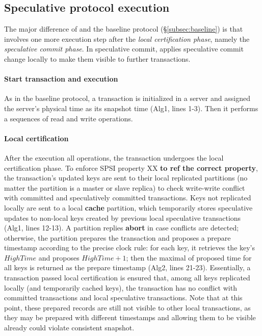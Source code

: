 \subsection{Speculative protocol execution}
\label{subsec:execution}
The major difference of \specula and the baseline protocol (\S \ref{subsec:baseline}) is that \specula involves one more execution step after the \textit{local certification phase}, namely the \textit{speculative commit phase}. In speculative commit, \specula applies speculative commit change locally to make them visible to further transactions.

\paragraph{Start transaction and execution} As in the baseline protocol, a transaction is initialized in a server and assigned the server's physical time as its snapshot time (Alg1, lines 1-3). Then it performs a sequences of read and write operations.

\paragraph{Local certification} After the execution all operations, the transaction undergoes the local certification phase. To enforce SPSI property XX \textbf{to ref the correct property}, the transaction's updated keys are sent to their local replicated partitions (no matter the partition is a master or slave replica) to check write-write conflict with committed and speculatively committed transactions. Keys not replicated locally are sent to a local \textbf{cache} partition, which temporarily stores speculative updates to non-local keys created by previous local speculative transactions (Alg1, lines 12-13). A partition replies \textbf{abort} in case conflicts are detected; otherwise, the partition prepares the transaction and proposes a prepare timestamp according to the precise clock rule: for each key, it retrieves the key's $HighTime$ and proposes $HighTime+1$; then the maximal of proposed time for all keys is returned as the prepare timestamp (Alg2, lines 21-23). Essentially, a transaction passed local certification is ensured that, among all keys replicated locally (and temporarily cached keys), the transaction has no conflict with committed transactions and local speculative transactions. Note that at this point, these prepared records are still not visible to other local transactions, as they may be prepared with different timestamps and allowing them to be visible already could violate consistent snapshot.

